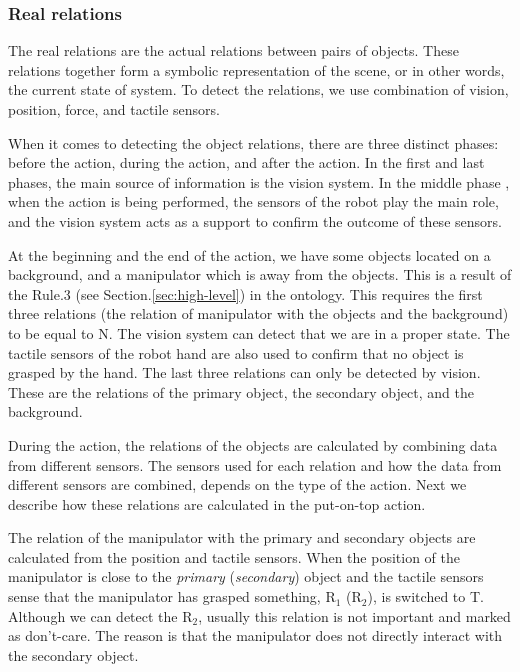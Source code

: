 \subsubsection{Real relations}
\label{sec:real_relations}
The real relations are the actual relations between pairs of objects.
These relations together form a symbolic representation of the scene, or in other words, the current state of system.
To detect the relations, we use combination of vision, position, force, and tactile sensors.

When it comes to detecting the object relations, there are three distinct phases: before the action, during the action, and after the action.
In the first and last phases, the main source of information is the vision system.
In the middle phase , when the action is being performed, the sensors of the robot play the main role,
and the vision system acts as a support to confirm the outcome of these sensors.

At the beginning and the end of the action, we have some objects located on a background, and a manipulator which is away from the objects.
This is a result of the Rule.3 (see Section.\ref{sec:high-level}) in the ontology.
This requires the first three relations (the relation of manipulator with the objects and the background) to be equal to N.
The vision system can detect that we are in a proper state.
The tactile sensors of the robot hand are also used to confirm that no object is grasped by the hand.
The last three relations can only be detected by vision.
These are the relations of the primary object, the secondary object, and the background.

During the action, the relations of the objects are calculated by combining data from different sensors.
The sensors used for each relation and how the data from different sensors are combined, depends on the type of the action.
Next we describe how these relations are calculated in the put-on-top action.

The relation of the manipulator with the primary and secondary objects are calculated from the position and tactile sensors.
When the position of the manipulator is close to the \textit{primary} (\textit{secondary}) object and the tactile sensors sense that the manipulator has grasped something,
$\text{R}_1$ ($\text{R}_2$), is switched to T.
Although we can detect the $\text{R}_2$, usually this relation is not important and marked as don't-care.
The reason is that the manipulator does not directly interact with the secondary object.

